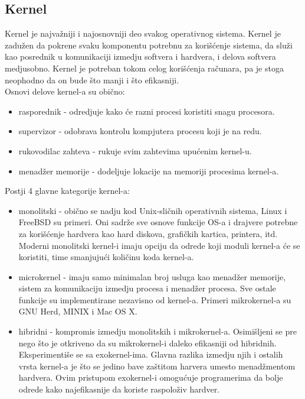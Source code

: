 \subsection{Kernel}
Kernel je najvažniji i najosnovniji deo svakog operativnog sistema. Kernel je zadužen da pokrene svaku komponentu potrebnu za korišćenje sistema, da služi kao posrednik u komunikaciji izmedju softvera i hardvera, i delova softvera medjusobno. Kernel je potreban tokom celog korišćenja računara, pa je stoga neophodno da on bude što manji i što efikasniji.\\
Osnovi delove kernel-a su obično:
\begin{itemize}
\item rasporednik - odredjuje kako će razni procesi koristiti snagu procesora.
\item supervizor - odobrava kontrolu kompjutera procesu koji je na redu.
\item rukovodilac zahteva - rukuje svim zahtevima upućenim kernel-u.
\item menadžer memorije - dodeljuje lokacije na memoriji procesima kernel-a.
\end{itemize}
Postji 4 glavne kategorije kernel-a:
\begin{itemize}
\item monolitski - obično se nadju kod Unix-sličnih operativnih sistema, Linux i FreeBSD su primeri. Oni sadrže sve osnove funkcije OS-a i drajvere potrebne za korišćenje hardvera kao hard diskova, grafičkih kartica, printera, itd. Moderni monolitski kernel-i imaju opciju da odrede koji moduli kernel-a će se koristiti, time smanjujući količinu koda kernel-a.
\item microkernel - imaju samo minimalan broj usluga kao menadžer memorije, sistem za komunikaciju izmedju procesa i menadžer procesa. Sve ostale funkcije su implementirane nezavisno od kernel-a. Primeri mikrokernel-a su GNU Herd, MINIX i Mac OS X.
\item hibridni - kompromis izmedju monolitskih i mikrokernel-a. Osimišljeni se pre nego što je otkriveno da su mikrokernel-i daleko efikasniji od hibridnih.\\
Eksperimentiše se sa exokernel-ima. Glavna razlika izmedju njih i ostalih vrsta kernel-a je što se jedino bave zaštitom harvera umesto menadžmentom hardvera. Ovim pristupom exokernel-i omogućuje programerima da bolje odrede kako najefikasnije da koriste raspoloživ hardver.
\end{itemize}
\newpage
